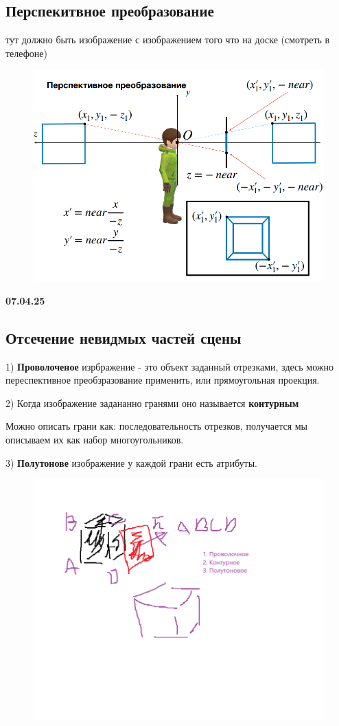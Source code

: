 \documentclass{article}
\begin{document}
\subsection{Перспекитвное преобразование}






тут должно быть изображение с изображением того что на доске (смотреть в телефоне)


\begin{figure} [H]
    \includegraphics[width=0.70\linewidth]{Снимок экрана 2025-03-31 133818.png}
\end{figure}


\vspace{5cm}

\textbf{07.04.25}

\subsection{Отсечение невидмых частей сцены}


1) \textbf{Проволоченое} изрбражение - это объект заданный отрезками, 
здесь можно переспективное преобзразование применить,
или прямоугольная проекция.

2) Когда изображение задананно гранями оно называется \textbf{контурным}

Можно описать грани как: последовательность отрезков, 
получается мы описываем их как набор многоугольников.

3) \textbf{Полутонове} изображение у каждой грани есть атрибуты.

\begin{figure} [H]
    \includegraphics[width=0.70\linewidth]{prpov.png}
\end{figure}
\end{document}

